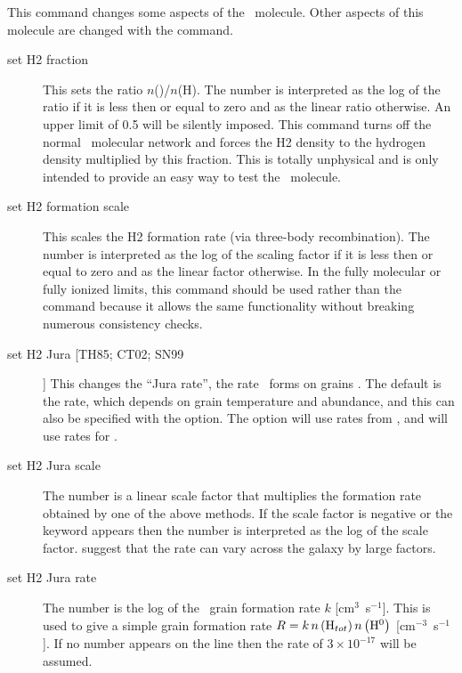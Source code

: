 This command changes some aspects of the \htwo\ molecule.
Other aspects
of this molecule are changed with the  command.

\begin{description}
\item[set H2 fraction]  This sets the ratio $n$(\htwo)/$n$(H).
The number is
interpreted as the log of the ratio if it is less then or equal to zero
and as the linear ratio otherwise.
An upper limit of 0.5 will be silently
imposed.
This command turns off the normal \htwo\ molecular network and forces
the H2 density to the hydrogen density multiplied by this fraction.
This
is totally unphysical and is only intended to provide an easy way to test
the \htwo\ molecule.

\item[set H2 formation scale]  This scales the H2 formation rate
(via three-body recombination). The number is
interpreted as the log of the scaling factor if it is less then or equal to zero
and as the linear factor otherwise.  In the fully molecular or fully
ionized limits, this command should be used rather than the
 command because it allows the same functionality without
breaking numerous consistency checks.

\item[set H2 Jura [TH85; CT02; SN99]]  This changes the ``Jura rate'', the rate
\htwo\ forms on grains \citep{Jura1975}.
The default is the \citet{Cazaux2002} rate, which
depends on grain temperature and abundance, and this can also be specified
with the  option.
The option  will use rates from \citet{Tielens1985a}, and  will use rates for \citet{Sternberg1999}.

\item[set H2 Jura scale]   The number is a linear scale factor that
multiplies the formation rate obtained by one of the above methods.  If
the scale factor is negative or the keyword  appears then the number
is interpreted as the log of the scale factor.
\citet{Habart2004} suggest
that the rate can vary across the galaxy by large factors.

\item[set H2 Jura rate]  The number is the log of the \htwo\ grain
formation rate $k$ [cm$^3$~s$^{-1}$].  This is used to give a simple grain formation
rate $R = k\,n\left( {{\mathrm{H}}_{tot} } \right)n\left( {\h0 } \right)$
 [cm$^{-3}$~s$^{-1}$].  If no number appears on the line then the \citet{Jura1975} rate
of $3 \times 10^{-17}$ will be assumed.


\end{description}
